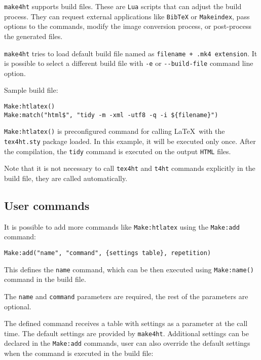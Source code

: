 \texttt{make4ht} supports build files. These are \texttt{Lua} scripts
that can adjust the build process. They can request external
applications like \texttt{BibTeX} or \texttt{Makeindex}, pass options to
the commands, modify the image conversion process, or post-process the
generated files.

\texttt{make4ht} tries to load default build file named as
\texttt{filename\ +\ .mk4\ extension}. It is possible to select a
different build file with \texttt{-e} or \texttt{-\/-build-file} command
line option.

Sample build file:

\begin{verbatim}
Make:htlatex()
Make:match("html$", "tidy -m -xml -utf8 -q -i ${filename}")
\end{verbatim}

\texttt{Make:htlatex()} is preconfigured command for calling \LaTeX~with
the \texttt{tex4ht.sty} package loaded. In this example, it will be
executed only once. After the compilation, the \texttt{tidy} command is
executed on the output \texttt{HTML} files.

Note that it is not necessary to call \texttt{tex4ht} and \texttt{t4ht}
commands explicitly in the build file, they are called automatically.

\hypertarget{user-commands}{%
\subsection{User commands}\label{user-commands}}

It is possible to add more commands like \texttt{Make:htlatex} using the
\texttt{Make:add} command:

\begin{verbatim}
Make:add("name", "command", {settings table}, repetition)
\end{verbatim}

This defines the \texttt{name} command, which can be then executed using
\texttt{Make:name()} command in the build file.

The \texttt{name} and \texttt{command} parameters are required, the rest
of the parameters are optional.

The defined command receives a table with settings as a parameter at the
call time. The default settings are provided by \texttt{make4ht}.
Additional settings can be declared in the \texttt{Make:add} commands,
user can also override the default settings when the command is executed
in the build file:

